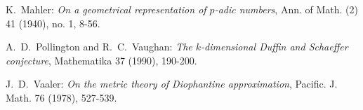 \documentclass[12pt,reqno]{amsart}
\begin{document}
\begin{thebibliography}{1}
K.~Mahler: \emph{On a geometrical representation of $p$-adic numbers}, Ann. of Math. (2) 41 (1940), no. 1, 8-56.

\vspace*{1ex}

A.~D.~Pollington and R.~C.~Vaughan: \emph{The $k$-dimensional
{D}uffin and {S}chaeffer conjecture}, Mathematika 37
(1990), 190-200.

\vspace*{1ex}

J.~D.~Vaaler: \emph{On the metric theory of Diophantine
approximation},
 Pacific. J. Math. 76 (1978), 527-539.

\end{thebibliography}
\end{document}
